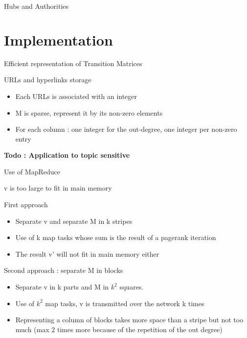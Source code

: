 \documentclass[10pt]{beamer}
\begin{document}
\begin{frame}{Hubs and Authorities}
\end{frame}


\section{Implementation}
\begin{frame}{Efficient representation of Transition Matrices}
  \begin{block}{URLs and hyperlinks storage}
  \begin{itemize}
    \item Each URLs is associated with an integer
    \item M is sparse, represent it by its non-zero elements
    \item For each column : one integer for the out-degree, one integer per non-zero entry
  \end{itemize}
  \textbf{Todo : Application to topic sensitive}
  \end{block}
\end{frame}

\begin{frame}{Use of MapReduce}
\begin{center}v  is too large to fit in main memory \end{center}
  \begin{block}{First approach}
    \begin{itemize}
      \item Separate v and separate M in k stripes
      \item Use of k map tasks whose sum is the result of a pagerank iteration
      \item The result v' will not fit in main memory either
    \end{itemize}
  \end{block}
  \begin{block}{Second approach : separate M in blocks}
    \begin{itemize}
      \item Separate v in k parts and M in $k^2$ squares.
      \item Use of $k^2$ map tasks, v is transmitted over the network k times
      \item Representing a column of blocks takes more space than a stripe but not too much (max 2 times more because of the repetition of the out degree)
    \end{itemize}
  \end{block}
\end{frame}
\end{document}

